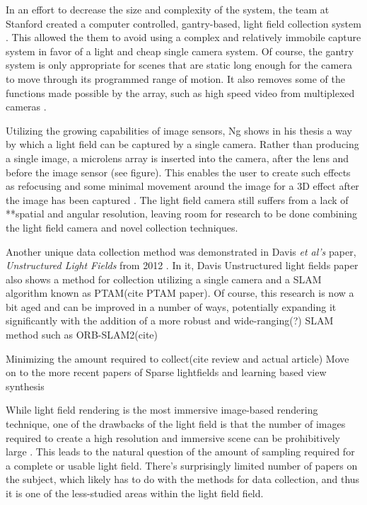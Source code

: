 \documentclass[12pt]{report}
\begin{document}
In an effort to decrease the size and complexity of the system, the team at Stanford created a computer controlled, gantry-based, light field collection system \cite{Koller04}. This allowed the them to avoid using a complex and relatively immobile capture system in favor of a light and cheap single camera system. Of course, the gantry system is only appropriate for scenes that are static long enough for the camera to move through its programmed range of motion. It also removes some of the functions made possible by the array, such as high speed video from multiplexed cameras \cite{Wilburn05}.

Utilizing the growing capabilities of image sensors, Ng shows in his thesis a way by which a light field can be captured by a single camera. Rather than producing a single image, a microlens array is inserted into the camera, after the lens and before the image sensor (see figure). This enables the user to create such effects as refocusing and some minimal movement around the image for a 3D effect after the image has been captured \cite{Ng06}. The light field camera still suffers from a lack of **spatial and angular resolution, leaving room for research to be done combining the light field camera and novel collection techniques.

Another unique data collection method was demonstrated in Davis \emph{et al's} paper, \emph{Unstructured Light Fields} from 2012 \cite{Davis12}. In it, Davis 
Unstructured light fields paper also shows a method for collection utilizing a single camera and a SLAM algorithm known as PTAM(cite PTAM paper). Of course, this research is now a bit aged and can be improved in a number of ways, potentially expanding it significantly with the addition of a more robust and wide-ranging(?) SLAM method such as ORB-SLAM2(cite)

Minimizing the amount required to collect(cite review and actual article)
Move on to the more recent papers of Sparse lightfields and learning 
based view synthesis

\cite{Ng06}
\cite{Davis12}
\cite{Oberlin16}


While light field rendering is the most immersive image-based rendering technique, one of the drawbacks of the light field is that the number of images required to create a high resolution and immersive scene can be prohibitively large \cite{Anderson16}. This leads to the natural question of the amount of sampling required for a complete or usable light field. There's surprisingly limited number of papers on the subject, which likely has to do with the methods for data collection, and thus it is one of the less-studied areas within the light field field.
\end{document}
